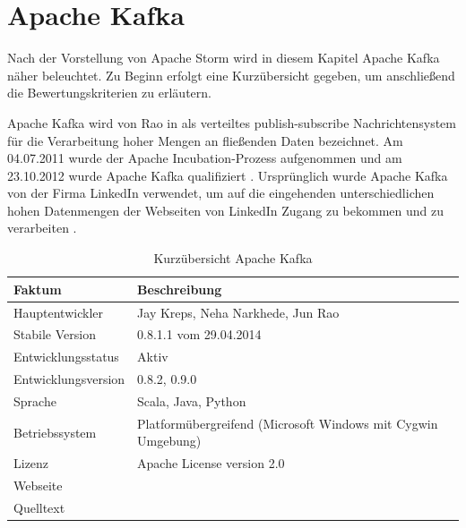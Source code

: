 \section{Apache Kafka}

Nach der Vorstellung von Apache Storm wird in diesem Kapitel Apache Kafka näher beleuchtet. Zu Beginn erfolgt eine Kurzübersicht gegeben, um anschließend die Bewertungskriterien zu erläutern. 

Apache Kafka wird von Rao in  als verteiltes publish-subscribe Nachrichtensystem für die Verarbeitung hoher Mengen an fließenden Daten bezeichnet. Am 04.07.2011 wurde der Apache Incubation-Prozess aufgenommen und am 23.10.2012 wurde Apache Kafka qualifiziert . Ursprünglich wurde Apache Kafka von der Firma LinkedIn  verwendet, um auf die eingehenden unterschiedlichen hohen Datenmengen der Webseiten von LinkedIn Zugang zu bekommen und zu verarbeiten .

\begin{table}[htbp]
	\centering
		\begin{tabular}{@{}ll@{}} \toprule
			\textbf{Faktum} & \textbf{Beschreibung} \\ \midrule
			Hauptentwickler & Jay Kreps, Neha Narkhede, Jun Rao \\
			Stabile Version & 0.8.1.1 vom 29.04.2014 \\ 
			Entwicklungsstatus &  Aktiv \\
			Entwicklungsversion & 0.8.2, 0.9.0 \\
			Sprache & Scala, Java, Python \\
			Betriebssystem & Platformübergreifend (Microsoft Windows mit Cygwin Umgebung) \\
			Lizenz & Apache License version 2.0 \\
			Webseite & \citeint{kafka:home} \\
			Quelltext & \citeint{kafka:GitHubApacheMirror} \\			
			\bottomrule			
		\end{tabular}
	\caption{Kurzübersicht Apache Kafka}
	\label{tab:vorkafka}
\end{table}


